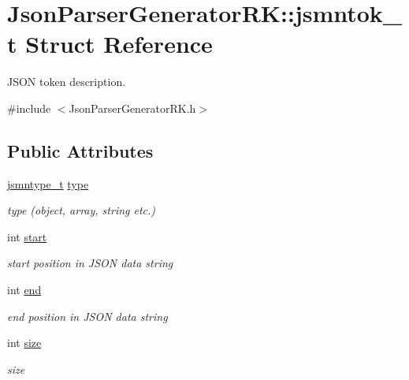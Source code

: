 \hypertarget{struct_json_parser_generator_r_k_1_1jsmntok__t}{}\section{Json\+Parser\+Generator\+RK\+:\+:jsmntok\+\_\+t Struct Reference}
\label{struct_json_parser_generator_r_k_1_1jsmntok__t}


J\+S\+ON token description.  




{\ttfamily \#include $<$Json\+Parser\+Generator\+R\+K.\+h$>$}

\subsection*{Public Attributes}
\begin{DoxyCompactItemize}
\item 
\hyperlink{namespace_json_parser_generator_r_k_a45d8af9d310679633d258ed9b2caeeb3}{jsmntype\+\_\+t} \hyperlink{struct_json_parser_generator_r_k_1_1jsmntok__t_af74f112dd9655aaa8da0a91e7c8f3495}{type}
\begin{DoxyCompactList}\small\item\em type (object, array, string etc.) \end{DoxyCompactList}\item 
int \hyperlink{struct_json_parser_generator_r_k_1_1jsmntok__t_a4fb68e88a6a7c366289a92c8b1332f4f}{start}
\begin{DoxyCompactList}\small\item\em start position in J\+S\+ON data string \end{DoxyCompactList}\item 
int \hyperlink{struct_json_parser_generator_r_k_1_1jsmntok__t_a7bd5d158fd8e6c1be21ab29994ef6bef}{end}
\begin{DoxyCompactList}\small\item\em end position in J\+S\+ON data string \end{DoxyCompactList}\item 
int \hyperlink{struct_json_parser_generator_r_k_1_1jsmntok__t_a4fe2f163e9a419ab974b88e95d9e6d9e}{size}
\begin{DoxyCompactList}\small\item\em size \end{DoxyCompactList}\end{DoxyCompactItemize}


